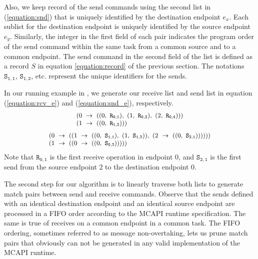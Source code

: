Also, we keep record of the send commands using the second list in (\ref{equation:snd}) that is uniquely identified by the destination endpoint $\mathit{e}_x$. Each sublist for the destination endpoint is uniquely identified by the source endpoint $\mathit{e}_y$. Similarly, the integer in the first field of each pair indicates the program order of the send command within the same task from a common source and to a common endpoint. The send command in the second field of the list is defined as a record $S$ in equation \ref{equation:record} of the previous section. The notations $\mathtt{S_{1,1}}$, $\mathtt{S_{1,2}}$, etc. represent the unique identifiers for the sends.

In our running example in , we generate our receive list and send list in equation (\ref{equation:rcv_e}) and (\ref{equation:snd_e}), respectively.
\begin{equation}
\footnotesize \begin{array}{l}
(0\ \rightarrow\ ((0,\ \mathtt{R_{0,1}}),\ (1,\ \mathtt{R_{0,2}}),\ (2,\ \mathtt{R_{0,4}})))\\
(1\ \rightarrow\ ((0,\ \mathtt{R_{1,2}})))\\
\end{array}
\label{equation:rcv_e}
\end{equation}
\begin{equation}
\footnotesize \begin{array}{l}
(0\ \rightarrow\ ((1\ \rightarrow\ ((0,\ \mathtt{S_{1,1}}),\ (1,\ \mathtt{S_{1,3}})),\ (2\ \rightarrow\ ((0,\ \mathtt{S_{2,1}}))))))\\
(1\ \rightarrow\ ((0\ \rightarrow\ ((0,\ \mathtt{S_{0,3}})))))\\
\end{array}
\label{equation:snd_e}
\end{equation}
Note that $\mathtt{R_{0,1}}$ is the first receive operation in endpoint 0, and $\mathtt{S_{2,1}}$ is the first send from the source endpoint 2 to the destination endpoint 0.

The second step for our algorithm is to linearly traverse both lists to generate match pairs between send and receive commands. Observe that the sends defined with an identical destination endpoint and an identical source endpoint are processed in a FIFO order according to the MCAPI runtime specification. The same is true of receives on a common endpoint in a common task. The FIFO ordering, sometimes referred to as message non-overtaking, lets us prune match pairs that obviously can not be generated in any valid implementation of the MCAPI runtime.

